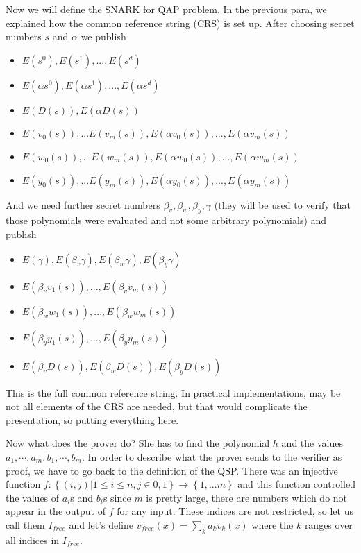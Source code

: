 \documentclass[12pt,letterpaper]{article}
\begin{document}
Now we will define the SNARK for QAP problem. In the previous para, we explained how the common reference string (CRS) is set up. After choosing secret numbers $s$ and $\alpha$ we publish
\begin{itemize}
    \item $E(s^0), E(s^1), ... , E(s^d)$
    \item $E(\alpha s^0), E(\alpha s^1), ... , E(\alpha s^d)$
    \item $E(D(s)), E(\alpha D(s))$
    \item $E(v_0(s)), ... E(v_m(s)), E(\alpha v_0(s)), ..., E(\alpha v_m(s))$
    \item $E(w_0(s)), ... E(w_m(s)), E(\alpha w_0(s)), ..., E(\alpha w_m(s))$
    \item $E(y_0(s)), ... E(y_m(s)), E(\alpha y_0(s)), ..., E(\alpha y_m(s))$
\end{itemize}
And we need further secret numbers $\beta_v, \beta_w, \beta_y, \gamma $ (they will be used to verify that those polynomials were evaluated and not some arbitrary polynomials) and publish
\begin{itemize}
    \item $E(\gamma), E(\beta_v\gamma), E(\beta_w\gamma), E(\beta_y\gamma)$
    \item $E(\beta_vv_1(s)), ... , E(\beta_vv_m(s))$
    \item $E(\beta_ww_1(s)), ... , E(\beta_ww_m(s))$
    \item $E(\beta_yy_1(s)), ... , E(\beta_yy_m(s))$
    \item $E(\beta_vD(s)), E(\beta_wD(s)), E(\beta_yD(s))$
\end{itemize}
This is the full common reference string. In practical implementations, may be not all elements of the CRS are needed, but that would complicate the presentation, so putting everything here.

Now what does the prover do? She has to find the polynomial $h$ and the values $a_1,\cdots ,a_m,b_1, \cdots ,b_m$. In order to describe what the prover sends to the verifier as proof, we have to go back to the definition of the QSP. There was an injective function $f: \left\{(i, j) |1\leq i \leq n, j\in{0,1} \right\} \to \left\{1, ... m\right\}$ and this function controlled the values of $a_i$s and $b_i$s since $m$ is pretty large, there are numbers which do not appear in the output of $f$ for any input. These indices are not restricted, so let us call them $I_{free}$ and let's define $v_{free}(x) = \sum_k a_kv_k(x)$ where the $k$ ranges over all indices in $I_{free}$. 
\end{document}
